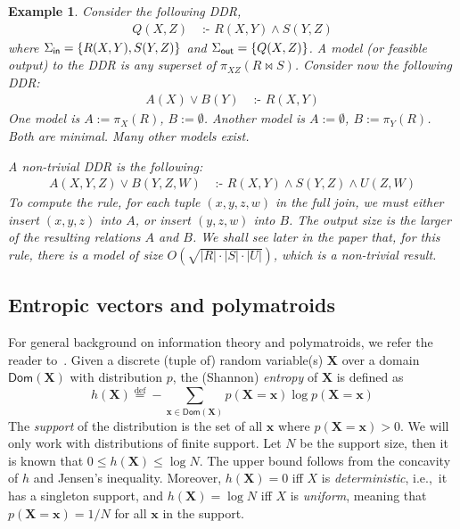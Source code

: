 \documentclass[10pt,a4paper]{article}
\newtheorem{example}{Example}[section]
\newcommand{\set}[1]{\{#1\}}                    %
\newcommand{\dom}{\textsf{Dom}}
\newcommand{\defeq}{\stackrel{\text{def}}{=}}
\newcommand{\cd}{\text{ :- }}
\newcommand{\inn}{\text{\sf in}}
\newcommand{\out}{\text{\sf out}}
\begin{document}
\begin{example}
  Consider the following DDR,
  \begin{align*}
    Q(X,Z) &\cd R(X,Y) \wedge S(Y,Z)
  \end{align*}
  where $\Sigma_\inn=\set{R(X,Y), S(Y,Z)}$ and
  $\Sigma_\out=\set{Q(X,Z)}$.  A model (or feasible output) to the DDR
is any superset of $\pi_{XZ}(R \Join S)$.
%
  Consider now the following DDR:
  \begin{align*}
    A(X) \vee B(Y) &\cd R(X,Y)
  \end{align*}
  One model is $A := \pi_X(R)$, $B := \emptyset$.  Another
  model is $A:= \emptyset$, $B := \pi_Y(R)$. Both are minimal.
  Many other models exist.

  A non-trivial DDR is the following:
  \begin{align}
    A(X,Y,Z) \vee B(Y,Z,W) &\cd R(X,Y) \wedge S(Y,Z) \wedge U(Z,W) \label{eq:ab:query}
  \end{align}
  To compute the rule, for each tuple $(x,y,z,w)$ in the full join, we
  must either insert $(x,y,z)$ into $A$, or insert $(y,z,w)$ into $B$.
  The output size is the larger of the resulting relations $A$ and $B$.
  We shall see later in the paper that, for this rule, there is a model of size
  $O(\sqrt{|R| \cdot |S| \cdot |U|})$, which is a non-trivial result.
\end{example}

\subsection{Entropic vectors and polymatroids}
\label{subsec:entropy}

For general background on information theory and polymatroids, we refer the reader
to~\cite{Yeung:2008:ITN:1457455}.
Given a discrete (tuple of) random variable(s) $\bm X$ over a domain $\dom(\bm X)$ with
distribution $p$, the (Shannon)
{\em entropy} of $\bm X$ is defined as
\[
  h(\bm X) \defeq -\sum_{\bm x\in \dom(\bm X)} p(\bm X=\bm x) \log p(\bm X=\bm x)
\]
The {\em support} of the distribution is the set of all $\bm x$ where $p(\bm X=\bm x) > 0$.
We will only work with distributions of finite support. Let $N$ be the support size, then it
is known that $0 \leq h(\bm X) \leq \log N$. The upper bound follows from the concavity of
$h$ and Jensen's inequality. Moreover, $h(\bm X) = 0$ iff $X$ is {\em deterministic}, i.e.,~it has a singleton support, and $h(\bm X) = \log N$ iff $X$ is {\em uniform}, meaning that
$p(\bm X=\bm x) = 1/N$ for all $\bm x$ in the support.
\end{document}
